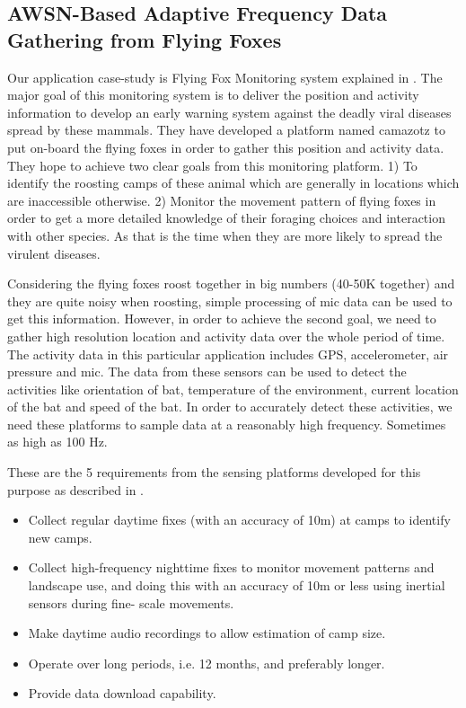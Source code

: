 \documentclass[conference]{IEEEtran}
\begin{document}
\subsection{AWSN-Based Adaptive Frequency Data Gathering from Flying Foxes} \label{case-study}
Our application case-study is Flying Fox Monitoring system explained in \cite{raja-ipsn}. 
The major goal of this monitoring system is to deliver the position and activity information to 
develop an early warning system against the deadly viral diseases spread by these mammals. 
They have developed a platform named camazotz to put on-board the flying foxes in order to 
gather this position and activity data. They hope to achieve two clear goals from this monitoring 
platform. 1) To identify the roosting camps of these animal which are 
generally in locations which are inaccessible otherwise. 2) Monitor the movement 
pattern of flying foxes in order to get a more detailed knowledge of their foraging choices and interaction 
with other species. As that is the time when they are more likely to spread the virulent diseases.\

Considering the flying foxes roost together in big numbers (40-50K together) and they are 
quite noisy when roosting\cite{Shilton-2008}, simple processing of mic data can be used to 
get this information. However, in order to achieve the second goal, we need to gather high 
resolution location and activity data over the whole period of time. The activity data in 
this particular application includes GPS, accelerometer, air pressure and mic. The data from 
these sensors can be used to detect the activities like orientation of bat, temperature of 
the environment, current location of the bat and speed of the bat. In order to accurately 
detect these activities, we need these platforms to sample data at a reasonably high frequency. 
Sometimes as high as 100 Hz. \

These are the 5 requirements from the sensing platforms developed for this purpose as described 
in \cite{raja-ipsn}.
\begin{itemize}
\item Collect regular daytime fixes (with an accuracy of 10m) at camps to identify new camps.
\item Collect high-frequency nighttime fixes to monitor movement patterns and landscape use, and 
doing this with an accuracy of 10m or less using inertial sensors during fine- scale movements.
\item Make daytime audio recordings to allow estimation of camp size.
\item Operate over long periods, i.e. 12 months, and preferably longer.
\item Provide data download capability.
\end{itemize}
\end{document}
